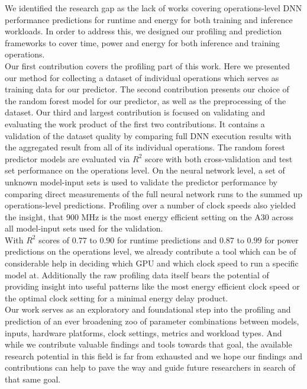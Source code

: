 We identified the research gap as the lack of works covering operations-level DNN performance predictions for runtime and energy for both training and inference workloads. In order to address this, we designed our profiling and prediction frameworks to cover time, power and energy for both inference and training operations. \\
Our first contribution covers the profiling part of this work. Here we presented our method for collecting a dataset of individual operations which serves as training data for our predictor. The second contribution presents our choice of the random forest model for our predictor, as well as the preprocessing of the dataset. Our third and largest contribution is focused on validating and evaluating the work product of the first two contributions. It contains a validation of the dataset quality by comparing full DNN execution results with the aggregated result from all of its individual operations. The random forest predictor models are evaluated via $R^2$ score with both cross-validation and test set performance on the operations level. On the neural network level, a set of unknown model-input sets is used to validate the predictor performance by comparing direct measurements of the full neural network runs to the summed up operations-level predictions. Profiling over a number of clock speeds also yielded the insight, that 900 MHz is the most energy efficient setting on the A30 across all model-input sets used for the validation. \\
With $R^2$ scores of $0.77$ to $0.90$ for runtime predictions and $0.87$ to $0.99$ for power predictions on the operations level, we already contribute a tool which can be of considerable help in deciding which GPU and which clock speed to run a specific model at. Additionally the raw profiling data itself bears the potential of providing insight into useful patterns like the most energy efficient clock speed or the optimal clock setting for a minimal energy delay product. \\
Our work serves as an exploratory and foundational step into the profiling and prediction of an ever broadening zoo of parameter combinations between models, inputs, hardware platforms, clock settings, metrics and workload types. And while we contribute valuable findings and tools towards that goal, the available research potential in this field is far from exhausted and we hope our findings and contributions can help to pave the way and guide future researchers in search of that same goal.

